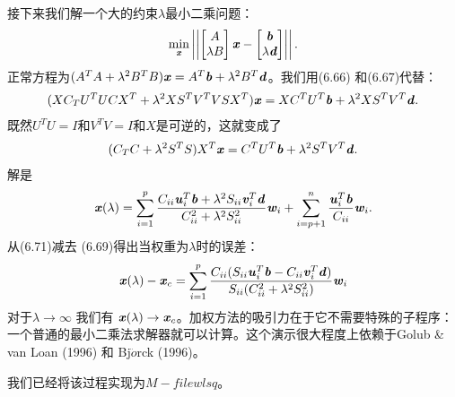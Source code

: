  接下来我们解一个大的约束$ \lambda $最小二乘问题：
 \begin{align*}
 \min_{\textbf{\textit{x}}} \left| \left| 
 \begin{bmatrix}
 A\\
 \lambda B
 \end{bmatrix} \textbf{\textit{x}} -
 \begin{bmatrix}
 \textbf{\textit{b}}\\
 \lambda \textbf{\textit{d}}
 \end{bmatrix}   \right| \right|   . 
 \end{align*}
 正常方程为$(A^{T}A + \lambda ^{2} B^{T}B)\textbf{\textit{x}} = A^{T}\textbf{\textit{b}} + \lambda ^{2} B^{T} \textbf{\textit{d}} $。我们用(6.66) 和(6.67)代替：
 \begin{align*}
 (XC_{T}U^{T}UCX^{T}+\lambda^{2}XS^{T}V^{T}VSX^{T})\textbf{\textit{x}}=XC^{T}U^{T}\textbf{\textit{b}}+\lambda^{2}XS^{T}V^{T}\textbf{\textit{d}}.
 \end{align*}
 既然$ U^{T}U=I$和$ V^{T}V=I$和$X$是可逆的，这就变成了
 \begin{align*}
 (C_{T}C + \lambda^{2}S^{T}S )X^{T}\textbf{\textit{x}} =
 C^{T}U^{T}\textbf{\textit{b}}+\lambda^{2}S^{T}V^{T}\textbf{\textit{d}}.
 \end{align*}
 解是
 \begin{align}
 \textbf{\textit{x}}(\lambda) =
 \sum_{i=1}^p \dfrac{C_{ii}\textbf{\textit{u}}^{T}_{i}\textbf{\textit{b}} +
 	\lambda^{2} S_{ii} \textbf{\textit{v}}^{T}_{i}\textbf{\textit{d}}
 }{C^{2}_{ii} + \lambda^{2}S^{2}_{ii}} \textbf{\textit{w}}_{i} +
 \sum_{i=p+1}^n
 \dfrac{\textbf{\textit{u}}^{T}_{i}\textbf{\textit{b}}}{C_{ii}}\textbf{\textit{w}}_{i}.
 \end{align}
 从(6.71)减去 (6.69)得出当权重为$ \lambda$时的误差：
 \begin{align}
 \textbf{\textit{x}}(\lambda) - \textbf{\textit{x}}_{c} =
 \sum_{i=1}^p \dfrac{C_{ii}( S_{ii}\textbf{\textit{u}}^{T}_{i}\textbf{\textit{b}}  - C_{ii}\textbf{\textit{v}}^{T}_{i}\textbf{\textit{d}} ) 
 }{S_{ii} (C^{2}_{ii} + \lambda^{2}S^{2}_{ii})} \textbf{\textit{w}}_{i} 
 \end{align}
 对于$ \lambda \rightarrow \infty$ 我们有 $\textbf{\textit{x}}(\lambda) \rightarrow  \textbf{\textit{x}}_{c}$。加权方法的吸引力在于它不需要特殊的子程序：一个普通的最小二乘法求解器就可以计算。这个演示很大程度上依赖于Golub \& van Loan (1996) 和 Bj$\ddot{o}$rck (1996)。
 
 我们已经将该过程实现为$M-file wlsq$。
 